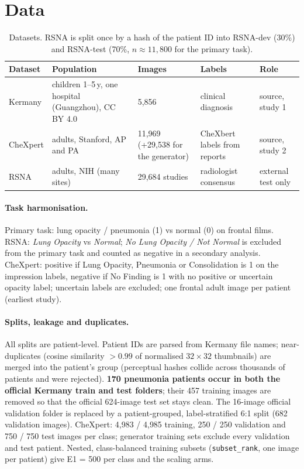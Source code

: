 \documentclass[11pt,a4paper]{article}
\newcommand{\code}[1]{\texttt{\small #1}}
\begin{document}
\section{Data}
\label{sec:data}

\begin{table}[h]\centering\small
\begin{tabularx}{\textwidth}{lYYYY}\toprule
Dataset & Population & Images & Labels & Role\\\midrule
Kermany \citep{kermany2018} & children 1--5\,y, one hospital (Guangzhou), CC BY 4.0 & 5{,}856 & clinical diagnosis & source, study 1\\
CheXpert \citep{irvin2019} & adults, Stanford, AP and PA & 11{,}969 (+29{,}538 for the generator) & CheXbert labels from reports & source, study 2\\
RSNA \citep{shih2019} & adults, NIH (many sites) & 29{,}684 studies & radiologist consensus & external test only\\\bottomrule
\end{tabularx}
\caption{Datasets. RSNA is split once by a hash of the patient ID into RSNA-dev (30\%) and RSNA-test (70\%, $n\approx 11{,}800$ for the primary task).}
\end{table}

\paragraph{Task harmonisation.} Primary task: lung opacity / pneumonia (1) vs normal (0) on frontal films. RSNA: \emph{Lung Opacity} vs \emph{Normal}; \emph{No Lung Opacity / Not Normal} is excluded from the primary task and counted as negative in a secondary analysis. CheXpert: positive if Lung Opacity, Pneumonia or Consolidation is 1 on the impression labels, negative if No Finding is 1 with no positive or uncertain opacity label; uncertain labels are excluded; one frontal adult image per patient (earliest study).

\paragraph{Splits, leakage and duplicates.} All splits are patient-level. Patient IDs are parsed from Kermany file names; near-duplicates (cosine similarity $>0.99$ of normalised $32{\times}32$ thumbnails) are merged into the patient's group (perceptual hashes collide across thousands of patients and were rejected). \textbf{170 pneumonia patients occur in both the official Kermany train and test folders}; their 457 training images are removed so that the official 624-image test set stays clean. The 16-image official validation folder is replaced by a patient-grouped, label-stratified 6:1 split (682 validation images). CheXpert: 4{,}983 / 4{,}985 training, 250 / 250 validation and 750 / 750 test images per class; generator training sets exclude every validation and test patient. Nested, class-balanced training subsets (\code{subset\_\allowbreak{}rank}, one image per patient) give E1 = 500 per class and the scaling arms.
\end{document}

